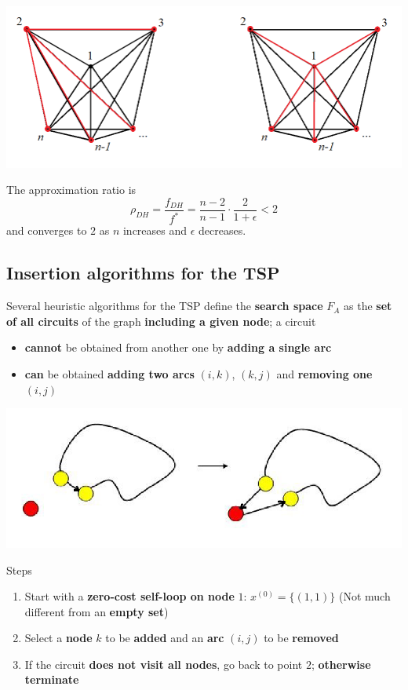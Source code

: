 \begin{center}
	\includegraphics[width=0.9\columnwidth]{img/STP3}
\end{center}

The approximation ratio is 
$$ \rho_{DH} = \frac{f_{DH}}{f^\ast} = \frac{n-2}{n-1} \cdot \frac{2}{1 + \epsilon} < 2 $$
and converges to $2$ as $n$ increases and $\epsilon$ decreases.\\

\newpage

\subsection{Insertion algorithms for the TSP}
Several heuristic algorithms for the TSP define the \textbf{search space} $F_A$ as the \textbf{set of all circuits} of the graph \textbf{including a given node}; a circuit
\begin{itemize}
	\item \textbf{cannot} be obtained from another one by \textbf{adding a single arc}
	\item \textbf{can} be obtained \textbf{adding two arcs} $(i, k)$, $(k, j)$ and \textbf{removing one} $(i, j)$
\end{itemize}

\begin{center}
	\includegraphics[width=0.8\columnwidth]{img/IATSP1}
\end{center}

Steps
\begin{enumerate}
	\item Start with a \textbf{zero-cost self-loop on node} $1$: $x^{(0)} = \{(1, 1)\}$ (Not much different from an \textbf{empty set})
	
	\item Select a \textbf{node} $k$ to be \textbf{added} and an \textbf{arc} $(i, j)$ to be \textbf{removed}
	
	\item If the circuit \textbf{does not visit all nodes}, go back to point $2$; \textbf{otherwise terminate}
\end{enumerate}

